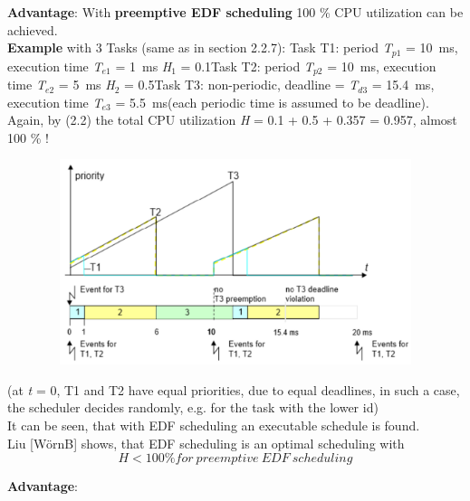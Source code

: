\textbf{Advantage}: With \textbf{preemptive EDF scheduling }100 \% CPU utilization can be achieved. \\

\textbf{Example} with 3 Tasks (same as in section 2.2.7): Task T1: period \textit{T}${}_{p1}$ = 10~ms, execution time \textit{T}${}_{e1}$ = 1~ms  \textit{H}${}_{1}$ = 0.1Task T2: period \textit{T}${}_{p2}$ = 10~ms, execution time\textit{ T}${}_{e2}$ = 5~ms  \textit{H}${}_{2}$ = 0.5Task T3: non-periodic, deadline = \textit{T}${}_{d3}$ = 15.4~ms, execution time\textit{ T}${}_{e3}$ = 5.5~ms(each periodic time is assumed to be deadline).\\

Again, by (2.2) the total CPU utilization \textit{H} = 0.1 + 0.5 + 0.357 = 0.957, almost 100 \% !\\

 	\begin{figure}[h]
    \centering
    \includegraphics[width=13cm, height=6cm]{Images/image101.png}
    \label{fig:Fig }
    \end{figure}
\newpage

(at \textit{t} = 0, T1 and T2 have equal priorities, due to equal deadlines, in such a case, the scheduler decides randomly, e.g. for the task with the lower id)\\

It can be seen, that with EDF scheduling an executable schedule is found. \\

Liu [W\"{o}rnB] shows, that EDF scheduling is an optimal scheduling with\\

\begin{equation}
	H \mathrm{<} 100 \% for\ preemptive\ EDF\ scheduling
\label{EQ }
\end{equation}

\textbf{Advantage}: 

